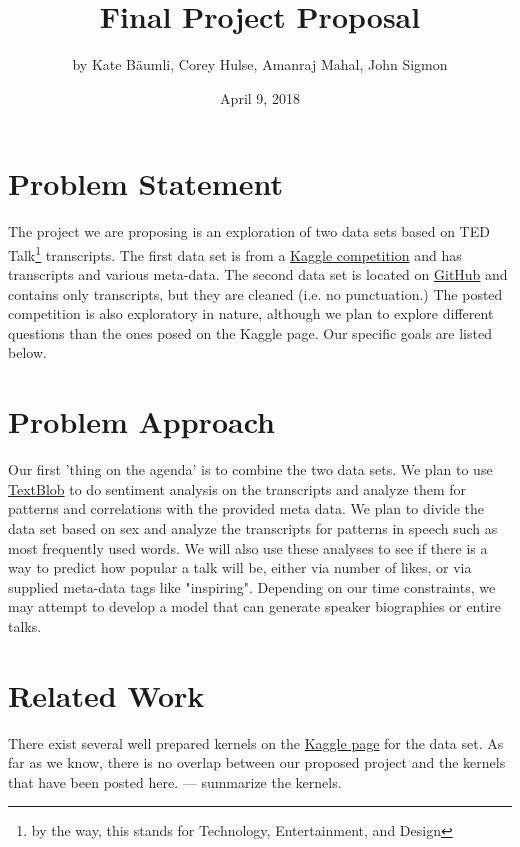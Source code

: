 \documentclass{article}
\title{Final Project Proposal}
\author{by Kate B{\"a}umli, Corey Hulse, Amanraj Mahal, John Sigmon}
\date{April 9, 2018}
\begin{document}
\maketitle

\section{Problem Statement}
The project we are proposing is an exploration of two data sets based on TED Talk\footnote{by the way, this stands for Technology, Entertainment, and Design} transcripts. The first data set is from a \href{https://www.kaggle.com/rounakbanik/ted-talks}{Kaggle competition} and has transcripts and various meta-data. The second data set is located on \href{https://github.com/saranyan/TED-Talks}{GitHub} and contains only transcripts, but they are cleaned (i.e. no punctuation.) The posted competition is also exploratory in nature, although we plan to explore different questions than the ones posed on the Kaggle page. Our specific goals are listed below.

\section{Problem Approach}
Our first 'thing on the agenda' is to combine the two data sets. We plan to use \href{http://textblob.readthedocs.io/en/dev/}{TextBlob} to do sentiment analysis on the transcripts and analyze them for patterns and correlations with the provided meta data. We plan to divide the data set based on sex and analyze the transcripts for patterns in speech such as most frequently used words. We will also use these analyses to see if there is a way to predict how popular a talk will be, either via number of likes, or via supplied meta-data tags like "inspiring". Depending on our time constraints, we may attempt to develop a model that can generate speaker biographies or entire talks.

\section{Related Work}
There exist several well prepared kernels on the \href{https://www.kaggle.com/rounakbanik/ted-talks/kernels}{Kaggle page} for the data set. As far as we know, there is no overlap between our proposed project and the kernels that have been posted here. --- summarize the kernels.
\end{document}
